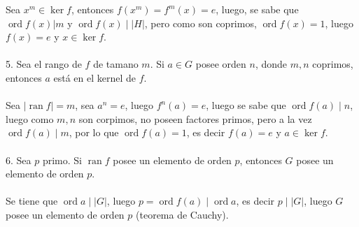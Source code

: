 \documentclass{article}
\begin{document}
Sea $x^{m} \in \ker{f}$, entonces $f(x^{m})=f^{m}(x)=e$, luego, se sabe que $\operatorname{ord}{f(x)}|m$ y $\operatorname{ord}{f(x)}\mid |H|$, pero como son coprimos, $\operatorname{ord}{f(x)}=1$, luego $f(x)=e$ y $x \in \ker{f}$.
\\
\\
5. Sea el rango de $f$ de tamano $m$. Si $a \in G$ posee orden $n$, donde $m,n$ coprimos, entonces $a$ está en el kernel de $f$.
\\
\\
Sea $|\operatorname{ran}{f}|=m$, sea $a^{n}=e$, luego $f^{n}(a)=e$, luego se sabe que $\operatorname{ord}{f(a)} \mid n$, luego como $m,n$ son corpimos, no poseen factores primos, pero a la vez $\operatorname{ord}{f(a)} \mid m$, por lo que $\operatorname{ord}{f(a)}=1$, es decir $f(a)=e$ y $a \in \ker{f}$.
\\
\\
6. Sea $p$ primo. Si $\operatorname{ran}{f}$ posee un elemento de orden $p$, entonces $G$ posee un elemento de orden $p$.
\\
\\
Se tiene que $\operatorname{ord}{a} \mid |G|$, luego $p=\operatorname{ord}{f(a)} \mid \operatorname{ord}{a}$, es decir $p \mid |G|$, luego $G$ posee un elemento de orden $p$ (teorema de Cauchy).
\end{document}
